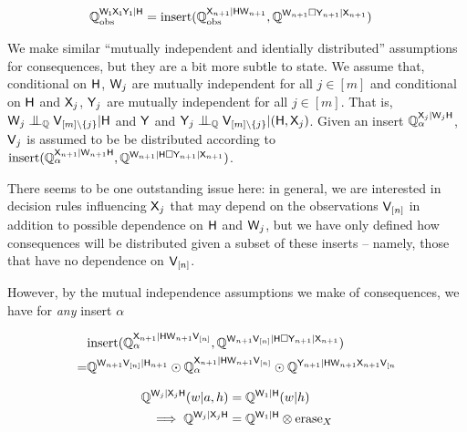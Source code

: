 \begin{align}
    \mathbb{Q}_{\text{obs}}^{\mathsf{W_1X_1Y_1}|\mathsf{H}} &= \text{insert}(\mathbb{Q}_{\text{obs}}^{\mathsf{X}_{n+1}|\mathsf{HW}_{n+1}},\mathbb{Q}^{\mathsf{W}_{n+1}\square\mathsf{Y}_{n+1}|\mathsf{X}_{n+1}})
\end{align}

We make similar ``mutually independent and identially distributed'' assumptions for consequences, but they are a bit more subtle to state. We assume that, conditional on $\mathsf{H}$, $\mathsf{W}_j$ are mutually independent for all $j\in [m]$ and conditional on $\mathsf{H}$ and $\mathsf{X}_j$, $\mathsf{Y}_j$ are mutually independent for all $j\in [m]$. That is, $\RV{W}_j\CI_{\model{Q}} \RV{V}_{[m]\setminus \{j\}}|\RV{H}$ and $\mathsf{Y}$ and $\RV{Y}_j\CI_{\model{Q}} \RV{V}_{[m]\setminus\{j\}}|(\RV{H},\RV{X}_j)$. Given an insert $\mathbb{Q}_{\alpha}^{\mathsf{X}_j|\mathsf{W}_j\mathsf{H}}$, $\mathsf{V}_j$ is assumed to be be distributed according to $\text{insert}(\mathbb{Q}_{\alpha}^{\mathsf{X}_{n+1}|\mathsf{W}_{n+1}\mathsf{H}},\mathbb{Q}^{\mathsf{W}_{n+1}|\mathsf{H}\square\mathsf{Y}_{n+1}|\mathsf{X}_{n+1}})$.

There seems to be one outstanding issue here: in general, we are interested in decision rules influencing $\mathsf{X}_j$ that may depend on the observations $\mathsf{V}_{[n]}$ in addition to possible dependence on $\mathsf{H}$ and $\mathsf{W}_j$, but we have only defined how consequences will be distributed given a subset of these inserts -- namely, those that have no dependence on $\mathsf{V}_{[n]}$. 

However, by the mutual independence assumptions we make of consequences, we have for \emph{any} insert $\alpha$

\begin{align}
    &\text{insert}(\mathbb{Q}_{\alpha}^{\mathsf{X}_{n+1}|\mathsf{HW}_{n+1}\mathsf{V}_{[n]}},\mathbb{Q}^{\mathsf{W}_{n+1}\mathsf{V}_{[n]}|\mathsf{H}\square\mathsf{Y}_{n+1}|\mathsf{X}_{n+1}})\\
     = &\mathbb{Q}^{\mathsf{W}_{n+1}\mathsf{V}_{[n]}|\mathsf{H}_{n+1}}\odot \mathbb{Q}_{\alpha}^{\mathsf{X}_{n+1}|\mathsf{HW}_{n+1}\mathsf{V}_{[n]}}\odot \mathbb{Q}^{\mathsf{Y}_{n+1}|\mathsf{HW}_{n+1}\mathsf{X}_{n+1}\mathsf{V}_{[n}}\\
\end{align}

\begin{align}
    \mathbb{Q}^{\mathsf{W}_j|\mathsf{X}_j\mathsf{H}}(w|a,h) &= \mathbb{Q}^{\mathsf{W}_1|\mathsf{H}}(w|h)\\
    \implies \mathbb{Q}^{\mathsf{W}_j|\mathsf{X}_j\mathsf{H}} &= \mathbb{Q}^{\mathsf{W}_1|\mathsf{H}}\otimes \text{erase}_{X}
\end{align}

